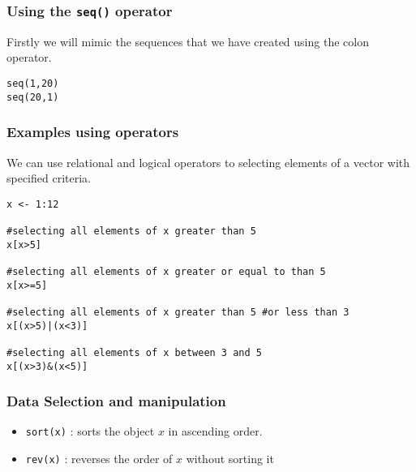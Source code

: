 \documentclass{beamer}
\begin{document}
\begin{frame}[fragile]
\frametitle{Using the \texttt{seq()} operator}
Firstly we will mimic the sequences that we have created using the colon operator.
\begin{framed}
\begin{verbatim}
seq(1,20)
seq(20,1)
\end{verbatim}
\end{framed}
\end{frame}

\begin{frame}[fragile]
\frametitle{Examples using operators}

We can use relational and logical operators to selecting elements
of a vector with specified criteria.

\begin{framed}
\begin{verbatim}
x <- 1:12

#selecting all elements of x greater than 5
x[x>5]

#selecting all elements of x greater or equal to than 5
x[x>=5]

#selecting all elements of x greater than 5 #or less than 3
x[(x>5)|(x<3)]

#selecting all elements of x between 3 and 5
x[(x>3)&(x<5)]
\end{verbatim}
\end{framed}
\end{frame}
\begin{frame}[fragile]
\frametitle{Data Selection and manipulation}

\begin{itemize}
\item \texttt{sort(x)} : sorts the object $x$ in ascending order.
\item \texttt{rev(x)} : reverses the order of $x$ without sorting it
\end{itemize}
\end{frame}
\end{document}
